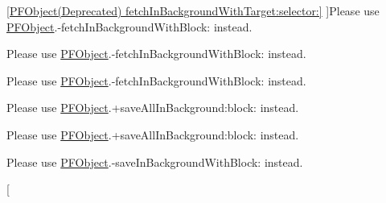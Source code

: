 \begin{DoxyRefList}
\hypertarget{deprecated__deprecated000021}{}%
\hyperlink{category_p_f_object_07_deprecated_08_af3eacaaeffebd4cc0ba339d765a50ade}{\mbox{[}P\+F\+Object(Deprecated) fetch\+In\+Background\+With\+Target\+:selector\+:\mbox{]}} ]Please use {\ttfamily \hyperlink{interface_p_f_object}{P\+F\+Object}.-\/fetch\+In\+Background\+With\+Block\+:} instead.  
\item[\label{deprecated__deprecated000020}%
\hypertarget{deprecated__deprecated000020}{}%
\hyperlink{category_p_f_object_07_deprecated_08_ac412f8feeb1d679db129dbb78efde1af}{\mbox{[}P\+F\+Object(Deprecated) refresh\+In\+Background\+With\+Target\+:selector\+:\mbox{]}} ]Please use {\ttfamily \hyperlink{interface_p_f_object}{P\+F\+Object}.-\/fetch\+In\+Background\+With\+Block\+:} instead.  
\item[\label{deprecated__deprecated000020}%
\hypertarget{deprecated__deprecated000020}{}%
\hyperlink{category_p_f_object_07_deprecated_08_ac412f8feeb1d679db129dbb78efde1af}{\mbox{[}P\+F\+Object(Deprecated) refresh\+In\+Background\+With\+Target\+:selector\+:\mbox{]}} ]Please use {\ttfamily \hyperlink{interface_p_f_object}{P\+F\+Object}.-\/fetch\+In\+Background\+With\+Block\+:} instead.  
\item[\label{deprecated__deprecated000019}%
\hypertarget{deprecated__deprecated000019}{}%
\hyperlink{category_p_f_object_07_deprecated_08_aa1fba48cec5bba80c72e6af4d8d88717}{\mbox{[}P\+F\+Object(Deprecated) save\+All\+In\+Background\+:target\+:selector\+:\mbox{]}} ]Please use {\ttfamily \hyperlink{interface_p_f_object}{P\+F\+Object}.+save\+All\+In\+Background\+:block\+:} instead.  
\item[\label{deprecated__deprecated000019}%
\hypertarget{deprecated__deprecated000019}{}%
\hyperlink{category_p_f_object_07_deprecated_08_aa1fba48cec5bba80c72e6af4d8d88717}{\mbox{[}P\+F\+Object(Deprecated) save\+All\+In\+Background\+:target\+:selector\+:\mbox{]}} ]Please use {\ttfamily \hyperlink{interface_p_f_object}{P\+F\+Object}.+save\+All\+In\+Background\+:block\+:} instead.  
\item[\label{deprecated__deprecated000018}%
\hypertarget{deprecated__deprecated000018}{}%
\hyperlink{category_p_f_object_07_deprecated_08_a26f570270d7ef495ba0de01fd6518fe9}{\mbox{[}P\+F\+Object(Deprecated) save\+In\+Background\+With\+Target\+:selector\+:\mbox{]}} ]Please use {\ttfamily \hyperlink{interface_p_f_object}{P\+F\+Object}.-\/save\+In\+Background\+With\+Block\+:} instead.  
\item[\label{deprecated__deprecated000018}%
\hypertarget{deprecated__deprecated000018}{}%

\end{DoxyRefList}
